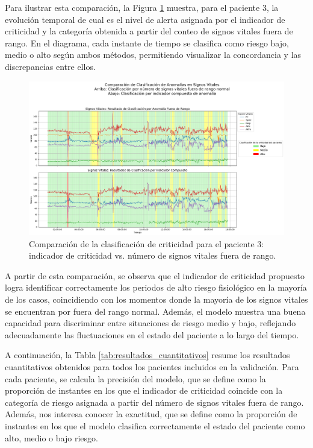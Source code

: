 Para ilustrar esta comparación, la Figura \ref{fig:comparacion_clasificacion_paciente3} muestra, para el paciente 3, la evolución temporal de cual es el nivel de alerta asignada por el indicador de criticidad y la categoría obtenida a partir del conteo de signos vitales fuera de rango. En el diagrama, cada instante de tiempo se clasifica como riesgo bajo, medio o alto según ambos métodos, permitiendo visualizar la concordancia y las discrepancias entre ellos.

\begin{figure}[H]
  \centering
  \includegraphics[width=\textwidth]{Images/comparacion_indicador_con_fuera_de_rango.png}
  \caption{Comparación de la clasificación de criticidad para el paciente 3: indicador de criticidad vs. número de signos vitales fuera de rango.}
  \label{fig:comparacion_clasificacion_paciente3}
\end{figure}

A partir de esta comparación, se observa que el indicador de criticidad propuesto logra identificar correctamente los periodos de alto riesgo fisiológico en la mayoría de los casos, coincidiendo con los momentos donde la mayoría de los signos vitales se encuentran por fuera del rango normal. Además, el modelo muestra una buena capacidad para discriminar entre situaciones de riesgo medio y bajo, reflejando adecuadamente las fluctuaciones en el estado del paciente a lo largo del tiempo.

A continuación, la Tabla \ref{tab:resultados_cuantitativos} resume los resultados cuantitativos obtenidos para todos los pacientes incluidos en la validación. Para cada paciente, se calcula la precisión del modelo, que se define como la proporción de instantes en los que el indicador de criticidad coincide con la categoría de riesgo asignada a partir del número de signos vitales fuera de rango. Además, nos interesa conocer la exactitud, que se define como la proporción de instantes en los que el modelo clasifica correctamente el estado del paciente como alto, medio o bajo riesgo.

